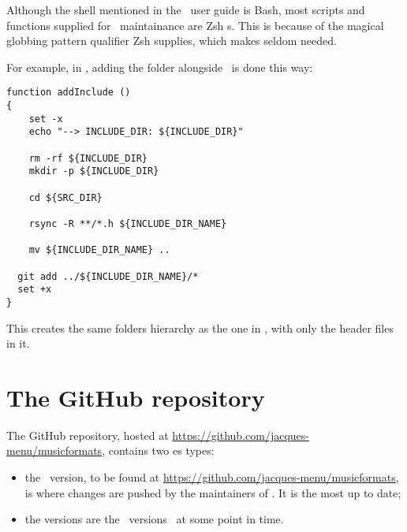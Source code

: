 Although the shell mentioned in the \mf\ user guide is Bash, most scripts and functions supplied for \mf\ maintainance are Zsh s.
This is because of the magical globbing pattern qualifier \code{**/} Zsh supplies, which makes  seldom needed.

For example, in , adding the  folder alongside \srcFolder\ is done this way:
\begin{lstlisting}[language=Terminal]
function addInclude ()
{
	set -x
	echo "--> INCLUDE_DIR: ${INCLUDE_DIR}"

	rm -rf ${INCLUDE_DIR}
	mkdir -p ${INCLUDE_DIR}

	cd ${SRC_DIR}

	rsync -R **/*.h ${INCLUDE_DIR_NAME}

	mv ${INCLUDE_DIR_NAME} ..

  git add ../${INCLUDE_DIR_NAME}/*
  set +x
}
\end{lstlisting}

This creates the same folders hierarchy as the one in \srcFolder, with only the  header files in it.


\section{The GitHub repository}

The GitHub repository, hosted at \url{https://github.com/jacques-menu/musicformats}, contains two \branch es types:
\begin{itemize}
\item the  \master\ version, to be found at \url{https://github.com/jacques-menu/musicformats}, is where changes are pushed by the maintainers of \mf. It is the most up to date;
\item the  versions are the \master\ versions \frozen\ at some point in time.
\end{itemize}
